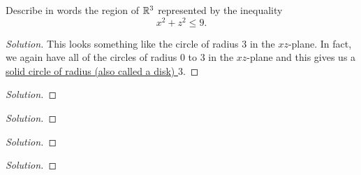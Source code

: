 \begin{problem}
Describe in words the region of $\mathbb{R}^3$ represented by the inequality
\[
x^2+z^2\leq 9.
\]
\end{problem}
\begin{proof}[Solution]
  This looks something like the circle of radius $3$ in the $xz$-plane. In
  fact, we again have all of the circles of radius $0$ to $3$ in the
  $xz$-plane and this gives us a \ul{solid circle of radius (also called a
    disk) $3$}.
\end{proof}

\begin{problem}

\end{problem}
\begin{proof}[Solution]
\end{proof}

\begin{problem}

\end{problem}
\begin{proof}[Solution]
\end{proof}

\begin{problem}

\end{problem}
\begin{proof}[Solution]
\end{proof}

\begin{problem}

\end{problem}
\begin{proof}[Solution]
\end{proof}

